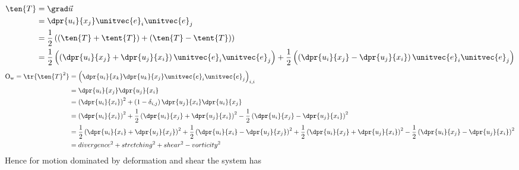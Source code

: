 \begin{derivation}\label{der:okubo}
\begin{equation}\begin{split}
\ten{T}
&=
\grad \vec{u}\\
&=
\dpr{u_i}{x_j} \unitvec{e}_i \unitvec{e}_j \\
&=
\frac{1}{2}\left(
\left(\ten{T}+\tent{T}\right)
+
\left( \ten{T} - \tent{T} \right)
\right) \\
&=
\frac{1}{2} \left( \left( \dpr{u_i}{x_j} + \dpr{u_j}{x_i}\right)
\unitvec{e}_i	\unitvec{e}_j \right)
+
\frac{1}{2} \left( \left( \dpr{u_i}{x_j} - \dpr{u_j}{x_i}\right)
\unitvec{e}_i	\unitvec{e}_j \right)
\end{split}\end{equation}
\begin{equation}\begin{split}
\mathrm{O_w}=\tr{\ten{T}^2}
&=
\left(
\dpr{u_i}{x_k} \dpr{u_k}{x_j} \unitvec{e}_i \unitvec{e}_j
\right)_{i,i}\\
&=
\dpr{u_i}{x_j} \dpr{u_j}{x_i}\\
&=
\left(\dpr{u_i}{x_i}\right)^2
+\left(1-\delta_{i,j}\right)\dpr{u_j}{x_i} \dpr{u_i}{x_j} \\
&=
\left(\dpr{u_i}{x_i}\right)^2
+
\frac{1}{2}\left( \dpr{u_i}{x_j} + \dpr{u_j}{x_i} \right)^2
-\frac{1}{2}\left( \dpr{u_i}{x_j} - \dpr{u_j}{x_i} \right)^2 \\
&=
\frac{1}{2}\left( \dpr{u_i}{x_i} + \dpr{u_j}{x_j} \right)^2
+\frac{1}{2}\left( \dpr{u_i}{x_i} - \dpr{u_j}{x_j} \right)^2
+
\frac{1}{2}\left( \dpr{u_i}{x_j} + \dpr{u_j}{x_i} \right)^2
-\frac{1}{2}\left( \dpr{u_i}{x_j} - \dpr{u_j}{x_i} \right)^2 \\
&=
divergence^2
+ stretching^2
+ shear^2
- vorticity^2
\end{split}\end{equation}
Hence for motion dominated by deformation and shear the system has

\end{derivation}

